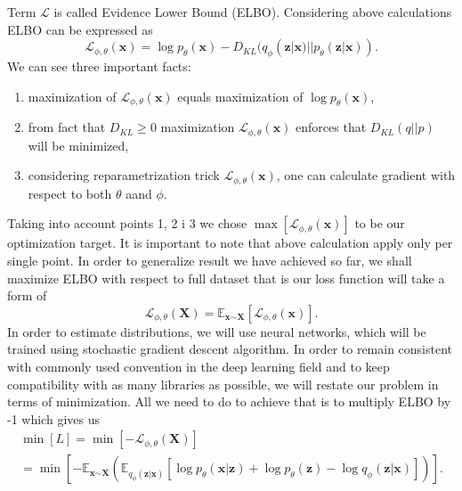 \documentclass[10pt]{article}
\begin{document}
Term $ \mathcal{L}$ is called  Evidence Lower Bound (ELBO).
Considering above calculations ELBO can be expressed as
\begin{equation} \label{eq:ELBO_v2}
    \mathcal{L}_{\phi, \theta}(\textbf{x}) =  
     \log p_{\theta}(\textbf{x})  -
    D_{KL}(q_{\phi }(\textbf{z}|\textbf{x})  || p_{\theta }(\textbf{z} | \textbf{x}) ).
\end{equation}
We can see three important facts:
\begin{enumerate}
\item maximization of $\mathcal{L}_{\phi, \theta}(\textbf{x}) $ equals maximization of  $ \log p_{\theta}(\textbf{x})$,
\item from fact that $D_{KL} \geq 0 $ maximization $\mathcal{L}_{\phi, \theta}(\textbf{x}) $ enforces that $D_{KL}(q||p)$ will be minimized,
\item considering reparametrization trick $\mathcal{L}_{\phi, \theta}(\textbf{x}) $, one can calculate gradient with respect to both $\theta$ aand $\phi$.
\end{enumerate}
Taking into account points 1, 2 i 3 we chose $ \max[\mathcal{L}_{\phi, \theta}(\textbf{x})]$ to be our optimization target. It is important to note that above calculation apply only per single point. In order to generalize result we have achieved so far, we shall maximize ELBO with respect to full dataset that is our loss function will take a form of 
\begin{equation}
    \mathcal{L}_{\phi, \theta}(\textbf{X}) = 
    \mathbb{E}_{\textbf{x} \sim \textbf{X}} [\mathcal{L}_{\phi, \theta}(\textbf{x})  ].
\end{equation}
In order to estimate distributions, we will use neural networks, which will be trained using stochastic gradient descent algorithm. In order to remain consistent with commonly used convention in the deep learning field and to keep compatibility with as many libraries as possible, we will restate our problem in terms of minimization. All we need to do to achieve that is to multiply ELBO by -1 which gives us 
\begin{equation} \label{eq:loss_func}
\begin{gathered}
     \min[L] = \min[-\mathcal{L}_{\phi, \theta}(\textbf{X})]\\ =
 \min[
    -\mathbb{E}_{\textbf{x} \sim \textbf{X}} (
    \mathbb{E}_{q_{\phi }(\textbf{z}|\textbf{x})}
    \left[ \log p_{\theta }(\textbf{x}| \textbf{z}) +\log p_{\theta}(\textbf{z}) -
   \log q_{\phi }(\textbf{z}|\textbf{x}) \right] 
    ) 
    ].
\end{gathered}
\end{equation}
\end{document}
